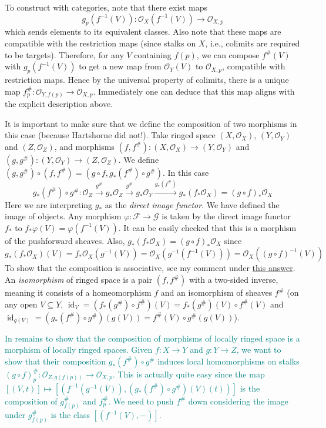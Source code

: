 \documentclass[12pt,letter]{article}
\newcommand{\id}[0]{\operatorname{id}}
\begin{document}
	To construct with categories, note that there exist maps 
	\[g_p(f^{-1}(V)):\mathscr O_X(f^{-1}(V))\to \mathscr O_{X, p}\] 
	which sends elements to its equivalent classes. Also note that these maps are compatible with the restriction maps (since stalks on $X$, i.e., colimits are required to be targets). Therefore, for any $V$ containing $f(p)$, we can compose $f^\#(V)$ with $g_p(f^{-1}(V))$ to get a new map from $\mathscr O_{Y}(V)$ to $\mathscr O_{X, p}$, compatible with restriction maps. Hence by the universal property of colimits, there is a unique map $f^\#_p:\mathscr O_{Y, f(p)}\to \mathscr O_{X,p}$. Immediately one can deduce that this map aligns with the explicit description above.
	
	It is important to make sure that we define the composition of two morphisms in this case (because Hartshorne did not!). Take ringed space $(X, \mathscr O_X)$, $(Y, \mathscr O_Y)$ and $(Z, \mathscr O_Z)$, and morphisms $(f, f^\#):(X, \mathscr O_X)\to (Y, \mathscr O_Y)$ and $(g, g^\#):(Y, \mathscr O_Y)\to (Z, \mathscr O_Z)$. We define $(g,g^\#)\circ (f, f^\#)=(g\circ f, g_*(f^\#)\circ g^\#)$. In this case 
	\[g_*(f^\#)\circ g^\#:\mathscr O_Z\xrightarrow{g^\#}g_*\mathscr O_Z\xrightarrow{g^\#}g_*\mathscr O_Y\xrightarrow{g_*(f^\#)}g_*(f_*\mathscr O_X)=(g\circ f)_*\mathscr O_X\]
	Here we are interpreting $g_*$ as the \textit{direct image functor}. We have defined the image of objects. Any morphism $\varphi:\mathscr F\to\mathscr G$ is taken by the direct image functor $f_*$ to $f_*\varphi(V)=\varphi(f^{-1}(V))$. It can be easily checked that this is a morphism of the pushforward sheaves. Also, $g_*(f_*\mathscr O_X)=(g\circ f)_*\mathscr O_X$ since 
	\[g_*(f_*\mathscr O_X)(V)=f_*\mathscr O_X(g^{-1}(V))=\mathscr O_X(g^{-1}(f^{-1}(V)))=\mathscr O_X((g\circ f)^{-1}(V))\]
	To show that the composition is associative, see my comment under \href{https://math.stackexchange.com/q/611617}{this answer}. An \textit{isomorphism} of ringed space is a pair $(f, f^\#)$ with a two-sided inverse, meaning it consists of a homeomorphism $f$ and an isomorphism of sheaves $f^\#$ (on any open $V\subseteq Y$, $\id_V=(f_*(g^\#)\circ f^\#)(V)=f_*(g^\#)(V)\circ f^\#(V)$ and $\id_{g(V)}=(g_*(f^\#)\circ g^\#)(g(V))=f^\#(V)\circ g^\#(g(V))$). 
	
	\textcolor{teal}{In remains to show that the composition of morphisms of locally ringed space is a morphism of locally ringed spaces. Given $f:X\to Y$ and $g:Y\to Z$, we want to show that their composition $g_*(f^\#)\circ g^\#$ induces local homomorphisms on stalks $(g\circ f)^\#_p:\mathscr O_{Z, g(f(p))}\to \mathscr O_{X, p}$. This is actually quite easy since the map $[(V, t)]\mapsto [(f^{-1}(g^{-1}(V)), (g_*(f^\#)\circ g^\#)(V)(t))]$ is the composition of $g^\#_{f(p)}$ and $f^\#_{p}$. We need to push $f^\#$ down considering the image under $g^\#_{f(p)}$ is the class $[(f^{-1}(V),-)]$.}
	
\end{document}
